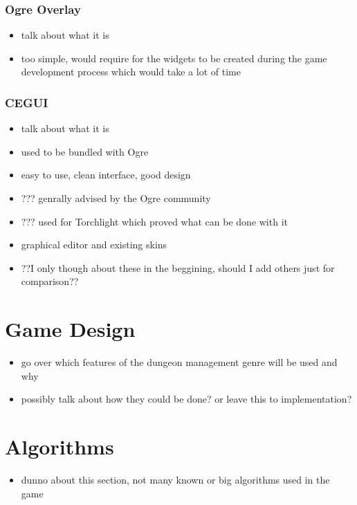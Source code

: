 \subsubsection{Ogre Overlay}

\begin{itemize}
    \item talk about what it is
    \item too simple, would require for the widgets to be created during
        the game development process which would take a lot of time
\end{itemize}

\subsubsection{CEGUI}

\begin{itemize}
    \item talk about what it is
    \item used to be bundled with Ogre
    \item easy to use, clean interface, good design
    \item ??? genrally advised by the Ogre community
    \item ??? used for Torchlight which proved what can be done with it
    \item graphical editor and existing skins
    \item ??I only though about these in the beggining, should I add
        others just for comparison??
\end{itemize}

\section{Game Design}

\begin{itemize}
    \item go over which features of the dungeon management genre will be used and why
    \item possibly talk about how they could be done? or leave this to implementation?
\end{itemize}

\section{Algorithms}

\begin{itemize}
    \item dunno about this section, not many known or big
        algorithms used in the game
\end{itemize}

